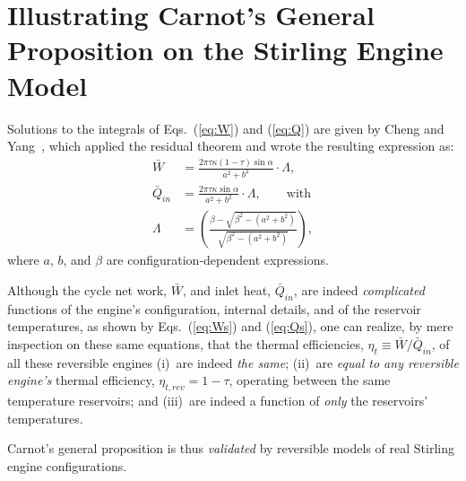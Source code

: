 \section{Illustrating Carnot's General Proposition on the Stirling Engine Model}

    Solutions to the integrals of Eqs.~(\ref{eq:W}) and (\ref{eq:Q})  are  given  by  Cheng  and
    Yang~\cite{2012-ChengCH+YangHS-ApEnergy}, which applied the residual theorem and  wrote  the
    resulting expression as:
    \begin{align}
        \label{eq:Ws}
        \bar{W} &= \frac{2\pi\tau\kappa(1 - \tau)\sin\alpha}{a^2 + b^2}\cdot\Lambda,\\
        \label{eq:Qs}
        \bar{Q}_{in} &= \frac{2\pi\tau\kappa\sin\alpha}{a^2 + b^2}\cdot\Lambda,
            \qquad\text{with}\\
        \label{eq:Lamda}
        \Lambda &= \left(
                \frac{\beta - \sqrt{\beta^2 - (a^2 + b^2)}}{\sqrt{\beta^2 - (a^2 + b^2)}}
            \right),
    \end{align}
    \noindent where $a$, $b$, and $\beta$ are configuration-dependent expressions.

    Although the  cycle  net  work,  $\bar{W}$,  and  inlet  heat,  $\bar{Q}_{in}$,  are  indeed
    \emph{complicated} functions of the engine's configuration, internal  details,  and  of  the
    reservoir temperatures, as shown by Eqs.~(\ref{eq:Ws}) and (\ref{eq:Qs}), one  can  realize,
    by mere inspection on these same equations, that the thermal  efficiencies,  $\eta_t  \equiv
    \bar{W} / \bar{Q}_{in}$, of all these reversible engines  (i)~are  indeed  \emph{the  same};
    (ii)~are \emph{equal to any reversible engine's} thermal efficiency,  $\eta_{t,rev}  =  1  -
    \tau$, operating between the same temperature reservoirs; and (iii)~are indeed a function of
    \emph{only} the reservoirs' temperatures.

    Carnot's general proposition is thus \emph{validated} by reversible models of real  Stirling
    engine configurations.

